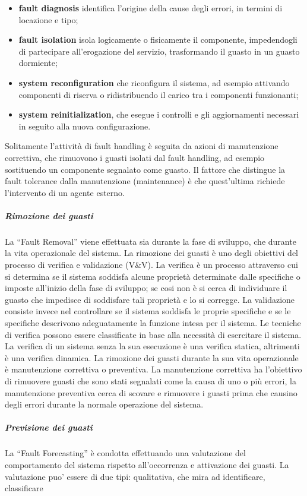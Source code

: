 \documentclass[14pt]{extarticle}
\begin{document}
\begin{itemize}
\item \textbf{fault diagnosis} identifica l'origine della cause degli errori, in termini di
locazione e tipo;
\item \textbf{fault isolation} isola logicamente o fisicamente il componente, impedendogli di partecipare all'erogazione del servizio, trasformando il guasto in
un guasto dormiente;
\item \textbf{system reconfiguration} che riconfigura il sistema, ad esempio attivando componenti di riserva o ridistribuendo il carico tra i componenti
funzionanti;
\item \textbf{system reinitialization}, che esegue i controlli e gli aggiornamenti necessari in seguito alla nuova configurazione.

\end{itemize}
Solitamente l'attività di fault handling è seguita da azioni di manutenzione correttiva, che rimuovono i guasti isolati dal fault handling, ad esempio
sostituendo un componente segnalato come guasto. Il fattore che distingue la
fault tolerance dalla manutenzione (maintenance) è che quest'ultima richiede
l'intervento di un agente esterno.
\subparagraph{Rimozione dei guasti}
La “Fault Removal” viene effettuata sia durante la fase di sviluppo, che durante la vita operazionale del sistema.
La rimozione dei guasti è uno degli obiettivi del processo di verifica e validazione (V\&V).
La verifica è un processo attraverso cui si determina se il sistema soddisfa alcune proprietà determinate dalle
specifiche o imposte all'inizio della fase di sviluppo; se cosi non è si cerca di
individuare il guasto che impedisce di soddisfare tali proprietà e lo si corregge.
La validazione consiste invece nel controllare se il sistema soddisfa le proprie
specifiche e se le specifiche descrivono adeguatamente la funzione intesa per il
sistema. Le tecniche di verifica possono essere classificate in base alla necessità di esercitare il sistema. La verifica di un sistema senza la sua esecuzione
è una verifica statica, altrimenti è una verifica dinamica. La rimozione dei
guasti durante la sua vita operazionale è manutenzione correttiva o preventiva. La manutenzione correttiva ha l'obiettivo di rimuovere guasti che sono
stati segnalati come la causa di uno o più errori, la manutenzione preventiva
cerca di scovare e rimuovere i guasti prima che causino degli errori durante la
normale operazione del sistema.
\subparagraph{Previsione dei guasti}
La “Fault Forecasting” è condotta effettuando una valutazione del comportamento del sistema rispetto all'occorrenza e attivazione dei guasti. La valutazione puo’ essere di due tipi: qualitativa, che mira ad identificare, classificare
\end{document}
